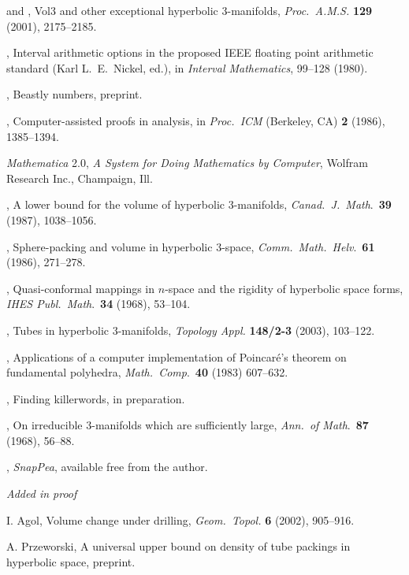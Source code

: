 \begin{references}
   and , Vol3 and other exceptional 
hyperbolic $3$-manifolds,  {\it Proc.\ A.M.S.} {\bf 129}
(2001), 2175--2185.
 
   , Interval arithmetic options in the 
proposed IEEE floating point arithmetic standard (Karl L.\ E.\ Nickel,
ed.), in  
{\it Interval Mathematics\/}, 99--128 (1980). 
 
   \bibline, Beastly numbers, preprint.
 
  , Computer-assisted proofs in analysis, 
in {\it Proc.\  ICM} (Berkeley, CA)  {\bf 2} (1986), 1385--1394.
 
  {\it Mathematica} 2.0, {\it A System for Doing Mathematics by Computer}, 
Wolfram Research Inc., Champaign,  Ill.
 
  , A lower bound for the volume of 
hyperbolic 
$3$-manifolds, {\it Canad.\ J.\ Math\/}.\ {\bf 39} (1987), 1038--1056.
 
  \bibline,  Sphere-packing and volume in 
hyperbolic $3$-space, {\it Comm.\ Math.\ Helv\/}.\  {\bf 61} (1986),
271--278.
 
  , Quasi-conformal mappings in $n$-space 
and the rigidity of hyperbolic space forms, {\it IHES Publ.\ Math\/}.\ 
{\bf 34} (1968), 53--104.
 
  , Tubes in hyperbolic $3$-manifolds, {\it Topology Appl.} {\bf
148/2-3} (2003), 103--122.
 
  , Applications of a computer implementation
of Poincar\'e's theorem on fundamental polyhedra,
{\it Math.\ Comp\/}.\  {\bf 40} (1983) 607--632.
 
  ,  Finding killerwords, in preparation. 
 


 , On irreducible $3$-manifolds which
are sufficiently large, {\it Ann.\ of Math\/}.\ {\bf 87} (1968), 56--88.
 
   , {\it SnapPea}, available free from the author.


\centerline{\elevenpoint\it Added in proof} 


 I. Agol, Volume change under drilling, {\it Geom.\ Topol.\/} {\bf 6} (2002), 905--916.

 A. Przeworski, A universal upper bound on density of tube packings in hyperbolic space,
preprint.

\end{references}

 


